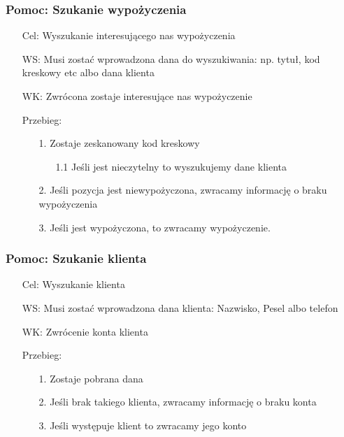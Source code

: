 \documentclass{article}
\begin{document}
\subsubsection{Pomoc: Szukanie wypożyczenia}
\begin{enumerate}
	\item[Cel:] Wyszukanie interesującego nas wypożyczenia
	\item[WS:] Musi zostać wprowadzona dana do wyszukiwania: np. tytuł, kod kreskowy etc albo dana klienta
	\item[WK:] Zwrócona zostaje interesujące nas wypożyczenie
	\item[Przebieg:]
\begin{enumerate}
	\item [1.]Zostaje zeskanowany kod kreskowy 
	\begin{enumerate}
		\item [1.1] Jeśli jest nieczytelny to wyszukujemy dane klienta
	\end{enumerate}
	\item [2.]Jeśli pozycja jest niewypożyczona, zwracamy informację o braku wypożyczenia
	\item [3.]Jeśli jest wypożyczona, to zwracamy wypożyczenie.
\end{enumerate}
\end{enumerate}

	\subsubsection{Pomoc: Szukanie klienta}
	\begin{enumerate}
		\item[Cel:] Wyszukanie klienta
		\item[WS:] Musi zostać wprowadzona dana klienta: Nazwisko, Pesel albo telefon
		\item[WK:] Zwrócenie konta klienta
		\item[Przebieg:]
	\begin{enumerate}
		\item [1.]Zostaje pobrana dana
		\item [2.]Jeśli brak takiego klienta, zwracamy informację o braku konta
		\item [3.]Jeśli występuje klient to zwracamy jego konto
	\end{enumerate}
	\end{enumerate}
	
\end{document}
